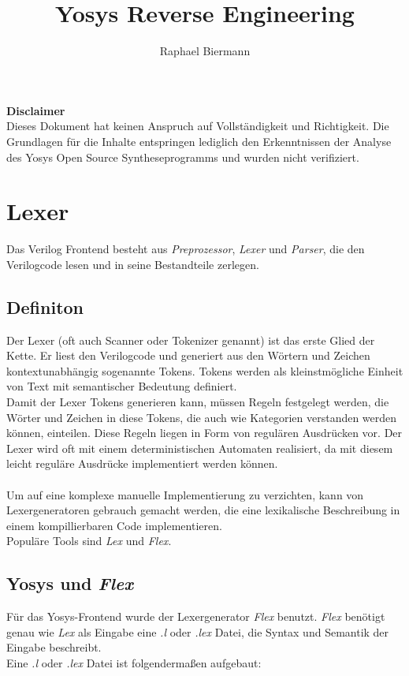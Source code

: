 \documentclass[11pt]{report}
\author{Raphael Biermann}
\title{Yosys Reverse Engineering}
\begin{document}
\maketitle
\tableofcontents
\newpage
\textbf{Disclaimer}
\\
Dieses Dokument hat keinen Anspruch auf Vollständigkeit und Richtigkeit. Die Grundlagen für die Inhalte entspringen lediglich den Erkenntnissen der Analyse des Yosys Open Source Syntheseprogramms und wurden nicht verifiziert.
\newpage
\chapter{Lexer}
Das Verilog Frontend besteht aus \textit{Preprozessor}, \textit{Lexer} und \textit{Parser}, die den Verilogcode lesen und in seine Bestandteile zerlegen.
\section{Definiton}
Der Lexer (oft auch Scanner oder Tokenizer genannt) ist das erste Glied der Kette. Er liest den Verilogcode und generiert aus den Wörtern und Zeichen kontextunabhängig sogenannte Tokens. Tokens werden als kleinstmögliche Einheit von Text mit semantischer Bedeutung definiert.\\
Damit der Lexer Tokens generieren kann, müssen Regeln festgelegt werden, die Wörter und Zeichen in diese Tokens, die auch wie Kategorien verstanden werden können, einteilen. Diese Regeln liegen in Form von regulären Ausdrücken vor.
Der Lexer wird oft mit einem deterministischen Automaten realisiert, da mit diesem leicht reguläre Ausdrücke implementiert werden können.\\
\\
Um auf eine komplexe manuelle Implementierung zu verzichten, kann von Lexergeneratoren gebrauch gemacht werden, die eine lexikalische Beschreibung in einem kompillierbaren Code implementieren.\\
Populäre Tools sind \textit{Lex} und \textit{Flex}.

\section{Yosys und \textit{Flex}}
Für das Yosys-Frontend wurde der Lexergenerator \textit{Flex} benutzt. \textit{Flex} benötigt genau wie \textit{Lex} als Eingabe eine \textit{.l} oder \textit{.lex} Datei, die Syntax und Semantik der Eingabe beschreibt.\\
Eine \textit{.l} oder \textit{.lex} Datei ist folgendermaßen aufgebaut:\\
\end{document}
